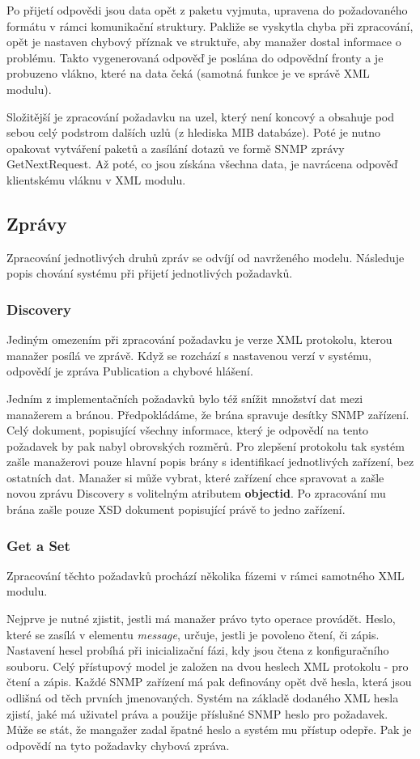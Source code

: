 Po přijetí odpovědi jsou data opět z paketu vyjmuta, upravena do požadovaného formátu v rámci komunikační struktury. Pakliže se vyskytla chyba při zpracování, opět
je nastaven chybový příznak ve struktuře, aby manažer dostal informace o problému. Takto vygenerovaná odpověď je poslána do odpovědní fronty a je probuzeno vlákno, které na
data čeká (samotná funkce je ve správě XML modulu).

Složitější je zpracování požadavku na uzel, který není koncový a obsahuje pod sebou celý podstrom dalších uzlů (z hlediska MIB databáze). Poté je nutno opakovat
vytváření paketů a zasílání dotazů ve formě SNMP zprávy GetNextRequest. Až poté, co jsou získána všechna data, je navrácena odpověď klientskému vláknu v XML modulu.


\subsection{Zprávy}
Zpracování jednotlivých druhů zpráv se odvíjí od navrženého modelu. Následuje popis chování systému při přijetí jednotlivých požadavků.

\subsubsection*{Discovery}
Jediným omezením při zpracování požadavku je verze XML protokolu, kterou manažer posílá ve zprávě. Když se rozchází s nastavenou 
verzí v systému, odpovědí je zpráva Publication a chybové hlášení.

Jedním z implementačních požadavků bylo též snížit množství dat mezi manažerem a bránou. Předpokládáme, že brána spravuje
desítky SNMP zařízení. Celý dokument, popisující všechny informace, který je odpovědí na tento požadavek by pak nabyl
obrovských rozměrů. Pro zlepšení protokolu tak systém zašle manažerovi pouze hlavní popis brány s identifikací jednotlivých zařízení, bez ostatních dat.
Manažer si může vybrat, které zařízení chce spravovat a zašle novou zprávu Discovery s volitelným atributem \textbf{objectid}. Po zpracování
mu brána zašle pouze XSD dokument popisující právě to jedno zařízení.

\subsubsection*{Get a Set}
Zpracování těchto požadavků prochází několika fázemi v rámci samotného XML modulu.

Nejprve je nutné zjistit, jestli má manažer právo tyto operace provádět. Heslo, které se zasílá v elementu \textit{message}, určuje, jestli je
povoleno čtení, či zápis. Nastavení hesel probíhá při inicializační fázi, kdy jsou čtena z konfiguračního souboru. Celý přístupový model je
založen na dvou heslech XML protokolu - pro čtení a zápis. Každé SNMP zařízení má pak definovány opět dvě hesla, která jsou odlišná od těch prvních jmenovaných.
Systém na základě dodaného XML hesla zjistí, jaké má uživatel práva a použije příslušné SNMP heslo pro požadavek. Může se stát, že mangažer zadal
špatné heslo a systém mu přístup odepře. Pak je odpovědí na tyto požadavky chybová zpráva.

